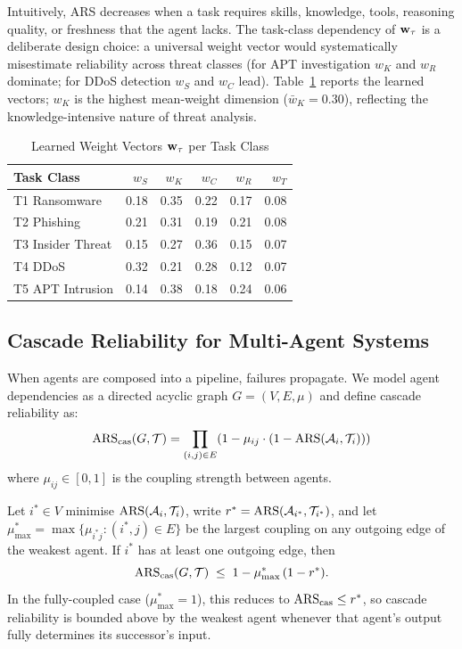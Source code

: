 Intuitively, ARS decreases when a task requires skills, knowledge, tools,
reasoning quality, or freshness that the agent lacks. The task-class
dependency of $\mathbf{w}_\tau$ is a deliberate design choice: a universal weight
vector would systematically misestimate reliability across threat classes
(for APT investigation $w_K$ and $w_R$ dominate; for DDoS detection $w_S$
and $w_C$ lead). Table~\ref{tab:weights_isaia} reports the learned vectors;
$w_K$ is the highest mean-weight dimension ($\bar{w}_K = 0.30$), reflecting
the knowledge-intensive nature of threat analysis.

\begin{table}[t]
\caption{Learned Weight Vectors $\mathbf{w}_\tau$ per Task Class}
\label{tab:weights_isaia}
\centering
\footnotesize
\begin{tabular}{lrrrrr}
\toprule
\textbf{Task Class} & $w_S$ & $w_K$ & $w_C$ & $w_R$ & $w_T$ \\
\midrule
T1 Ransomware       & 0.18 & 0.35 & 0.22 & 0.17 & 0.08 \\
T2 Phishing         & 0.21 & 0.31 & 0.19 & 0.21 & 0.08 \\
T3 Insider Threat   & 0.15 & 0.27 & 0.36 & 0.15 & 0.07 \\
T4 DDoS             & 0.32 & 0.21 & 0.28 & 0.12 & 0.07 \\
T5 APT Intrusion    & 0.14 & 0.38 & 0.18 & 0.24 & 0.06 \\
\bottomrule
\end{tabular}
\end{table}

\subsection{Cascade Reliability for Multi-Agent Systems}

When agents are composed into a pipeline, failures propagate. We model
agent dependencies as a directed acyclic graph $G = (V, E, \mu)$ and
define cascade reliability as:
\begin{equation}
  \mathrm{ARS}_{\mathrm{cas}}(G, \mathcal{T}) = \prod_{(i,j) \in E}
    \!\left(1 - \mu_{ij} \cdot (1 - \mathrm{ARS}(\mathcal{A}_i, \mathcal{T}_i))\right)
  \label{eq:cascade}
\end{equation}
where $\mu_{ij} \in [0,1]$ is the coupling strength between agents.

\begin{theorem}
\label{thm:cascade}
  Let $i^* \in V$ minimise $\mathrm{ARS}(\mathcal{A}_i, \mathcal{T}_i)$, write
  $r^* = \mathrm{ARS}(\mathcal{A}_{i^*}, \mathcal{T}_{i^*})$, and let
  $\mu^*_{\max} = \max\{\mu_{i^*j} : (i^*, j) \in E\}$ be the largest
  coupling on any outgoing edge of the weakest agent. If $i^*$ has at
  least one outgoing edge, then
  \begin{equation}
    \mathrm{ARS}_{\mathrm{cas}}(G, \mathcal{T}) \;\leq\; 1 - \mu^*_{\max}\,(1 - r^*).
    \label{eq:cascade_bound}
  \end{equation}
  In the fully-coupled case ($\mu^*_{\max} = 1$), this reduces to
  $\mathrm{ARS}_{\mathrm{cas}} \leq r^*$, so cascade reliability is bounded above
  by the weakest agent whenever that agent's output fully determines its
  successor's input.
\end{theorem}

